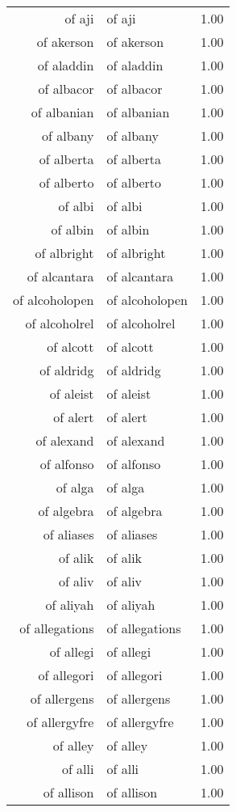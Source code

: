 \begin{table}[ht]
\begin{tabular}{rlr}
  of aji & of aji & 1.00 \\ 
  of akerson & of akerson & 1.00 \\ 
  of aladdin & of aladdin & 1.00 \\ 
  of albacor & of albacor & 1.00 \\ 
  of albanian & of albanian & 1.00 \\ 
  of albany & of albany & 1.00 \\ 
  of alberta & of alberta & 1.00 \\ 
  of alberto & of alberto & 1.00 \\ 
  of albi & of albi & 1.00 \\ 
  of albin & of albin & 1.00 \\ 
  of albright & of albright & 1.00 \\ 
  of alcantara & of alcantara & 1.00 \\ 
  of alcoholopen & of alcoholopen & 1.00 \\ 
  of alcoholrel & of alcoholrel & 1.00 \\ 
  of alcott & of alcott & 1.00 \\ 
  of aldridg & of aldridg & 1.00 \\ 
  of aleist & of aleist & 1.00 \\ 
  of alert & of alert & 1.00 \\ 
  of alexand & of alexand & 1.00 \\ 
  of alfonso & of alfonso & 1.00 \\ 
  of alga & of alga & 1.00 \\ 
  of algebra & of algebra & 1.00 \\ 
  of aliases & of aliases & 1.00 \\ 
  of alik & of alik & 1.00 \\ 
  of aliv & of aliv & 1.00 \\ 
  of aliyah & of aliyah & 1.00 \\ 
  of allegations & of allegations & 1.00 \\ 
  of allegi & of allegi & 1.00 \\ 
  of allegori & of allegori & 1.00 \\ 
  of allergens & of allergens & 1.00 \\ 
  of allergyfre & of allergyfre & 1.00 \\ 
  of alley & of alley & 1.00 \\ 
  of alli & of alli & 1.00 \\ 
  of allison & of allison & 1.00 \\ 

\end{tabular}
\end{table}
